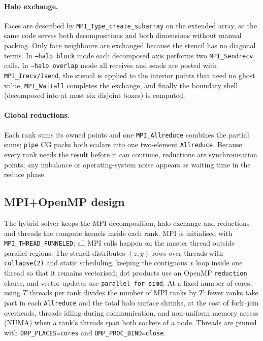 \documentclass[11pt,a4paper]{article}
\begin{document}
\paragraph{Halo exchange.} Faces are described by \texttt{MPI\_Type\_create\_subarray} on the
extended array, so the same code serves both decompositions and both dimensions without manual
packing. Only face neighbours are exchanged because the stencil has no diagonal terms. In
\texttt{--halo block} mode each decomposed axis performs two \texttt{MPI\_Sendrecv} calls. In
\texttt{--halo overlap} mode all receives and sends are posted with \texttt{MPI\_Irecv/Isend}, the
stencil is applied to the interior points that need no ghost value, \texttt{MPI\_Waitall} completes
the exchange, and finally the boundary shell (decomposed into at most six disjoint boxes) is
computed.

\paragraph{Global reductions.} Each rank sums its owned points and one \texttt{MPI\_Allreduce}
combines the partial sums; \texttt{pipe} CG packs both scalars into one two-element
\texttt{Allreduce}. Because every rank needs the result before it can continue, reductions are
synchronisation points; any imbalance or operating-system noise appears as waiting time in the
reduce phase.

\subsection{MPI+OpenMP design}\label{sec:omp}
The hybrid solver keeps the MPI decomposition, halo exchange and reductions and threads
the compute kernels inside each rank. MPI is initialised with \texttt{MPI\_THREAD\_FUNNELED}; all
MPI calls happen on the master thread outside parallel regions. The stencil distributes
$(z,y)$ rows over threads with \texttt{collapse(2)} and static scheduling, keeping the contiguous
$x$ loop inside one thread so that it remains vectorised; dot products use an OpenMP
\texttt{reduction} clause, and vector updates use \texttt{parallel for simd}. At a fixed
number of cores, using $T$ threads per rank divides the number of MPI ranks by $T$: fewer ranks
take part in each \texttt{Allreduce} and the total halo surface shrinks, at the cost of
fork--join overheads, threads idling during communication, and non-uniform memory access (NUMA)
when a rank's threads span both sockets of a node. Threads are pinned with
\texttt{OMP\_PLACES=cores} and \texttt{OMP\_PROC\_BIND=close}.
\end{document}
